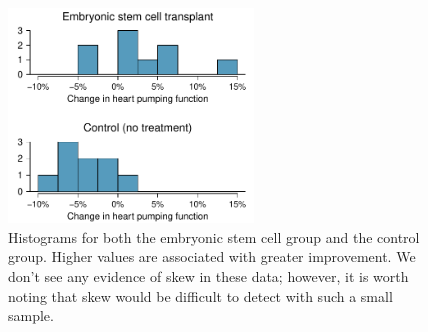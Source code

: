 {\begin{figure}[h]
\centering
\includegraphics[width=0.58\textwidth]{ch_inference_for_means/figures/stemCellTherapyForHearts/stemCellTherapyForHearts}
\caption{Histograms for both the embryonic stem cell group and the control group. Higher values are associated with greater improvement. We don't see any evidence of skew in these data; however, it is worth noting that skew would be difficult to detect with such a small sample.}
\label{stemCellTherapyForHearts}
\end{figure}



}
